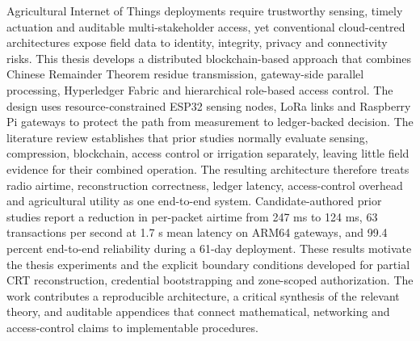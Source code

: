 \documentclass[12pt,a4paper,oneside]{book}
\begin{document}
\clearpage

Agricultural Internet of Things deployments require trustworthy sensing,
timely actuation and auditable multi-stakeholder access, yet conventional
cloud-centred architectures expose field data to identity, integrity, privacy
and connectivity risks. This thesis develops a distributed blockchain-based
approach that combines Chinese Remainder Theorem residue transmission,
gateway-side parallel processing, Hyperledger Fabric and hierarchical
role-based access control. The design uses resource-constrained ESP32 sensing
nodes, LoRa links and Raspberry Pi gateways to protect the path from
measurement to ledger-backed decision. The literature review establishes that
prior studies normally evaluate sensing, compression, blockchain, access
control or irrigation separately, leaving little field evidence for their
combined operation. The resulting architecture therefore treats radio airtime,
reconstruction correctness, ledger latency, access-control overhead and
agricultural utility as one end-to-end system. Candidate-authored prior studies
report a reduction in per-packet airtime from 247 ms to 124 ms, 63 transactions
per second at 1.7 s mean latency on ARM64 gateways, and 99.4 percent
end-to-end reliability during a 61-day deployment. These results motivate the
thesis experiments and the explicit boundary conditions developed for partial
CRT reconstruction, credential bootstrapping and zone-scoped authorization.
The work contributes a reproducible architecture, a critical synthesis of the
relevant theory, and auditable appendices that connect mathematical,
networking and access-control claims to implementable procedures.

\clearpage
 
\begin{singlespace}
\renewcommand{\contentsname}{}
\vspace{-3\baselineskip}
\tableofcontents
\end{singlespace}
\clearpage

\begin{singlespace}
\renewcommand{\listfigurename}{}
\vspace{-3\baselineskip}
\listoffigures
\end{singlespace}
\clearpage

\begin{singlespace}
\renewcommand{\listtablename}{}
\vspace{-3\baselineskip}
\listoftables
\end{singlespace}
\clearpage
\end{document}
